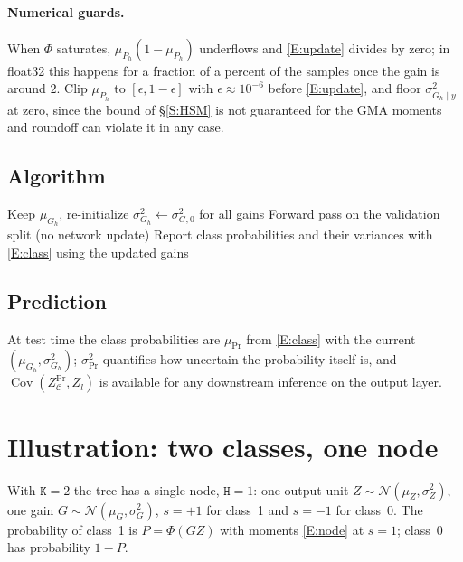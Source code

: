 \documentclass[letterpaper]{article}
\begin{document}
\paragraph{Numerical guards.} When $\Phi$ saturates, $\mu_{P_h}(1-\mu_{P_h})$ underflows and \eqref{E:update} divides by zero; in float32 this happens for a fraction of a percent of the samples once the gain is around $2$. Clip $\mu_{P_h}$ to $[\epsilon,1-\epsilon]$ with $\epsilon\approx10^{-6}$ before \eqref{E:update}, and floor $\sigma^2_{G_h\mid y}$ at zero, since the bound of \S\ref{S:HSM} is not guaranteed for the GMA moments and roundoff can violate it in any case.

\subsection{Algorithm}
\begin{algorithm}[H]
\caption{Gain calibration pass, run on the validation split after each epoch (gains initialized once with a weakly informative prior, e.g.\ $\mu_{G_h}=0.3$, $\sigma_{G,0}=1$). The training loop is standard TAGI and is not modified.}
Keep $\mu_{G_h}$, re-initialize $\sigma^2_{G_h}\leftarrow\sigma^2_{G,0}$ for all gains\;
Forward pass on the validation split (no network update)\;
Report class probabilities and their variances with \eqref{E:class} using the updated gains\;
\end{algorithm}

\subsection{Prediction}
At test time the class probabilities are $\mu_{\Pr}$ from \eqref{E:class} with the current $(\mu_{G_h},\sigma^2_{G_h})$; $\sigma^2_{\Pr}$ quantifies how uncertain the probability itself is, and $\operatorname{Cov}(Z^{\Pr}_{\mathcal C},Z_l)$ is available for any downstream inference on the output layer.

\section{Illustration: two classes, one node}\label{S:ex}
With $\mathtt K=2$ the tree has a single node, $\mathtt H=1$: one output unit $Z\sim\mathcal N(\mu_Z,\sigma_Z^2)$, one gain $G\sim\mathcal N(\mu_G,\sigma_G^2)$, $s=+1$ for class~1 and $s=-1$ for class~0. The probability of class~1 is $P=\Phi(GZ)$ with moments \eqref{E:node} at $s=1$; class~0 has probability $1-P$.
\end{document}
